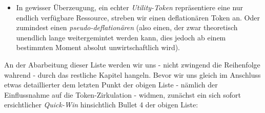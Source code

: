 \begin{Assumption}
\begin{itemize}
\begin{itemize}
		\item In gewisser Überzeugung, ein echter \textit{Utility-Token} repräsentiere eine nur endlich verfügbare Ressource, streben wir einen deflationären Token an. Oder zumindest einen \textit{pseudo-deflationären} (also einen, der zwar theoretisch unendlich lange weitergemintet werden kann, dies jedoch ab einem bestimmten Moment absolut unwirtschaftlich wird).
	\end{itemize}
\end{itemize}

\end{Assumption}

\vspace{0.5cm}

An der Abarbeitung dieser Liste werden wir uns - nicht zwingend die Reihenfolge wahrend - durch das restliche Kapitel hangeln. Bevor wir uns gleich im Anschluss etwas detaillierter dem letzten Punkt der obigen Liste - nämlich der Einflussnahme auf die Token-Zirkulation - widmen, zunächst ein sich sofort ersichtlicher \textit{Quick-Win} hinsichtlich Bullet 4 der obigen Liste:

\vspace{0.3cm}

